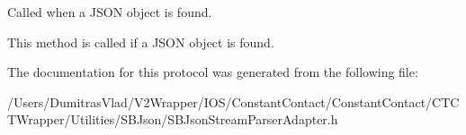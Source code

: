 Called when a J\-S\-O\-N object is found. 

This method is called if a J\-S\-O\-N object is found. 

The documentation for this protocol was generated from the following file\-:\begin{DoxyCompactItemize}
\item 
/\-Users/\-Dumitras\-Vlad/\-V2\-Wrapper/\-I\-O\-S/\-Constant\-Contact/\-Constant\-Contact/\-C\-T\-C\-T\-Wrapper/\-Utilities/\-S\-B\-Json/S\-B\-Json\-Stream\-Parser\-Adapter.\-h\end{DoxyCompactItemize}
